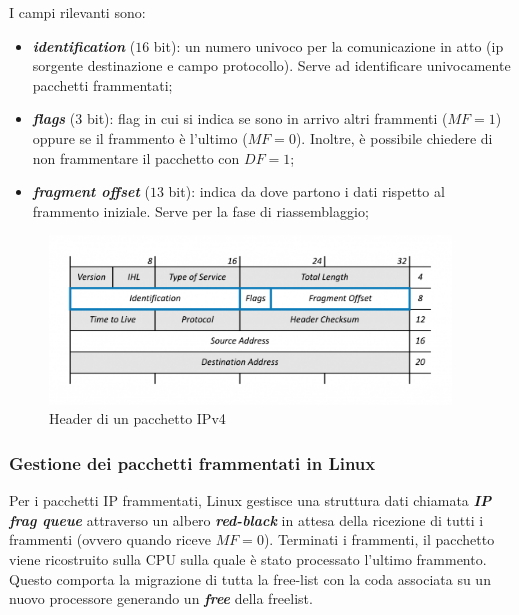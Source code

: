 \documentclass{article}
\begin{document}
I campi rilevanti sono:
\begin{itemize}
  \item \textbf{\textit{identification}} ($16$ bit): un numero univoco per la comunicazione in atto (ip sorgente 
    destinazione e campo protocollo). Serve ad identificare univocamente pacchetti frammentati;
  \item \textbf{\textit{flags}} ($3$ bit): flag in cui si indica se sono in arrivo altri frammenti ($MF=1$) oppure 
    se il frammento è l'ultimo ($MF=0$). Inoltre, è possibile chiedere di non frammentare il 
    pacchetto con $DF=1$;
  \item \textbf{\textit{fragment offset}} ($13$ bit): indica da dove partono i dati rispetto 
    al frammento iniziale. Serve per la fase di riassemblaggio;
\end{itemize}

\begin{figure}[h]
  \begin{center}
    \includegraphics[width=0.95\textwidth]{figures/ch1/IPv4-Headers-Standard-Fragmentation-Highlighted-1024x431.png}
  \end{center}
  \caption{Header di un pacchetto IPv4}\label{fig:ipv4-header}
\end{figure}

\subsubsection{Gestione dei pacchetti frammentati in Linux}
Per i pacchetti IP frammentati, Linux gestisce una struttura dati chiamata \textbf{\textit{IP 
frag queue}} attraverso un albero \textbf{\textit{red-black}} in attesa della ricezione di tutti 
i frammenti (ovvero quando riceve $MF = 0$). Terminati i frammenti, il pacchetto viene 
ricostruito sulla CPU sulla quale è stato processato l'ultimo frammento. Questo comporta 
la migrazione di tutta la free-list con la coda associata su un nuovo processore 
generando un \textbf{\textit{free}} della freelist. 
\end{document}
